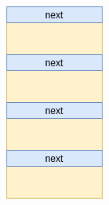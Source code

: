 \documentclass[xcolor=table]{beamer}
\begin{document}
\begin{frame}[fragile]
\begin{columns}[c]
\begin{figure}[H]
\centering
\includegraphics[width=1\textwidth]{pic/1}%
\end{figure}
	
\end{columns}

\end{frame}
\end{document}
